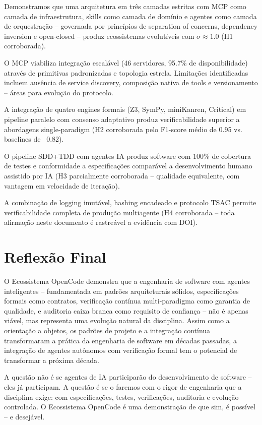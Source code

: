 \documentclass[12pt,a4paper,sumario=tradicional]{abntex2}
\begin{document}
\begin{description}[style=nextline,leftmargin=2cm]
    \item[QP1 -- Arquitetura:] Demonstramos que uma arquitetura em três camadas estritas com MCP como camada de infraestrutura, skills como camada de domínio e agentes como camada de orquestração -- governada por princípios de separation of concerns, dependency inversion e open-closed -- produz ecossistemas evolutíveis com $\sigma \approx 1.0$ (H1 corroborada).
    \item[QP2 -- Interoperabilidade:] O MCP viabiliza integração escalável (46 servidores, 95.7\% de disponibilidade) através de primitivas padronizadas e topologia estrela. Limitações identificadas incluem ausência de service discovery, composição nativa de tools e versionamento -- áreas para evolução do protocolo.
    \item[QP3 -- Raciocínio:] A integração de quatro engines formais (Z3, SymPy, miniKanren, Critical) em pipeline paralelo com consenso adaptativo produz verificabilidade superior a abordagens single-paradigm (H2 corroborada pelo F1-score médio de 0.95 vs. baselines de ~0.82).
    \item[QP4 -- Qualidade:] O pipeline SDD+TDD com agentes IA produz software com 100\% de cobertura de testes e conformidade a especificações comparável a desenvolvimento humano assistido por IA (H3 parcialmente corroborada -- qualidade equivalente, com vantagem em velocidade de iteração).
    \item[QP5 -- Auditoria:] A combinação de logging imutável, hashing encadeado e protocolo TSAC permite verificabilidade completa de produção multiagente (H4 corroborada -- toda afirmação neste documento é rastreável a evidência com DOI).
\end{description}

\section{Reflexão Final}

O Ecossistema OpenCode demonstra que a engenharia de software com agentes inteligentes -- fundamentada em padrões arquiteturais sólidos, especificações formais como contratos, verificação contínua multi-paradigma como garantia de qualidade, e auditoria caixa branca como requisito de confiança -- não é apenas viável, mas representa uma evolução natural da disciplina. Assim como a orientação a objetos, os padrões de projeto e a integração contínua transformaram a prática da engenharia de software em décadas passadas, a integração de agentes autônomos com verificação formal tem o potencial de transformar a próxima década.

A questão não é se agentes de IA participarão do desenvolvimento de software -- eles já participam. A questão é se o faremos com o rigor de engenharia que a disciplina exige: com especificações, testes, verificações, auditoria e evolução controlada. O Ecossistema OpenCode é uma demonstração de que sim, é possível -- e desejável.


\end{document}
